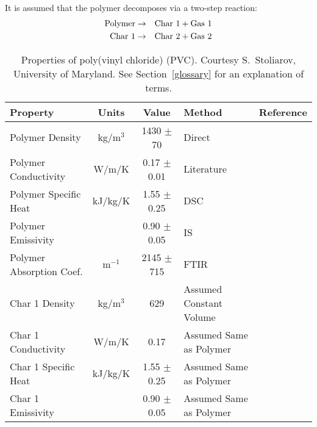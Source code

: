 It is assumed that the polymer decomposes via a two-step reaction:
\begin{eqnarray}
   \hbox{Polymer} &\to& \hbox{Char 1} + \hbox{Gas 1}  \\
   \hbox{Char 1}  &\to& \hbox{Char 2} + \hbox{Gas 2}
\end{eqnarray}


\begin{table}[h!]
\caption[Properties of poly(vinyl chloride) (PVC).]{Properties of poly(vinyl chloride) (PVC). Courtesy S.~Stoliarov, University of Maryland. See Section~\ref{glossary} for an explanation of terms.}
\begin{center}
\begin{tabular}{|l|c|c|l|l|}
\hline
Property                    & Units         & Value                             & Method                    &  Reference                                \\ \hline \hline
Polymer Density             & kg/m$^3$      & 1430 $\pm$ 70                     & Direct                    &  \cite{Stoliarov:CF2010}                  \\ \hline
Polymer Conductivity        & W/m/K         & 0.17 $\pm$ 0.01                   & Literature                &  \cite{Stoliarov:CF2010}                  \\ \hline
Polymer Specific Heat       & kJ/kg/K       & 1.55 $\pm$ 0.25                   & DSC                       &  \cite{Stoliarov:PDS2008}                 \\ \hline
Polymer Emissivity          &               & 0.90 $\pm$ 0.05                   & IS                        &  \cite{Hallman:PES1974}                   \\ \hline
Polymer Absorption Coef.    & m$^{-1}$      & 2145 $\pm$ 715                    & FTIR                      &  \cite{Tsilingiris:ECM2003}               \\ \hline
Char 1 Density              & kg/m$^3$      & 629                               & Assumed Constant Volume   &  \cite{Stoliarov:CF2010}                  \\ \hline
Char 1 Conductivity         & W/m/K         & 0.17                              & Assumed Same as Polymer   &  \cite{Stoliarov:CF2010}                  \\ \hline
Char 1 Specific Heat        & kJ/kg/K       & 1.55 $\pm$ 0.25                   & Assumed Same as Polymer   &  \cite{Stoliarov:CF2010}                  \\ \hline
Char 1 Emissivity           &               & 0.90 $\pm$ 0.05                   & Assumed Same as Polymer   &  \cite{Stoliarov:CF2010}                  \\ \hline

\end{tabular}
\end{center}
\end{table}
